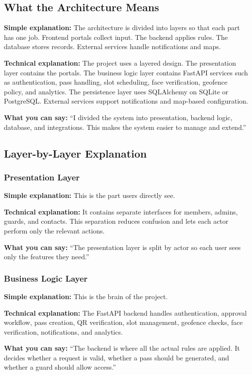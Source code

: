 \documentclass[12pt,letterpaper]{article}
\newcommand{\simple}[1]{\textbf{Simple explanation:} #1}
\newcommand{\technical}[1]{\textbf{Technical explanation:} #1}
\newcommand{\say}[1]{\textbf{What you can say:} ``#1''}
\begin{document}
\subsection{What the Architecture Means}

\simple{The architecture is divided into layers so that each part has one job. Frontend portals collect input. The backend applies rules. The database stores records. External services handle notifications and maps.}

\technical{The project uses a layered design. The presentation layer contains the portals. The business logic layer contains FastAPI services such as authentication, pass handling, slot scheduling, face verification, geofence policy, and analytics. The persistence layer uses SQLAlchemy on SQLite or PostgreSQL. External services support notifications and map-based configuration.}

\say{I divided the system into presentation, backend logic, database, and integrations. This makes the system easier to manage and extend.}

\subsection{Layer-by-Layer Explanation}

\subsubsection{Presentation Layer}

\simple{This is the part users directly see.}

\technical{It contains separate interfaces for members, admins, guards, and contacts. This separation reduces confusion and lets each actor perform only the relevant actions.}

\say{The presentation layer is split by actor so each user sees only the features they need.}

\subsubsection{Business Logic Layer}

\simple{This is the brain of the project.}

\technical{The FastAPI backend handles authentication, approval workflow, pass creation, QR verification, slot management, geofence checks, face verification, notifications, and analytics.}

\say{The backend is where all the actual rules are applied. It decides whether a request is valid, whether a pass should be generated, and whether a guard should allow access.}
\end{document}
